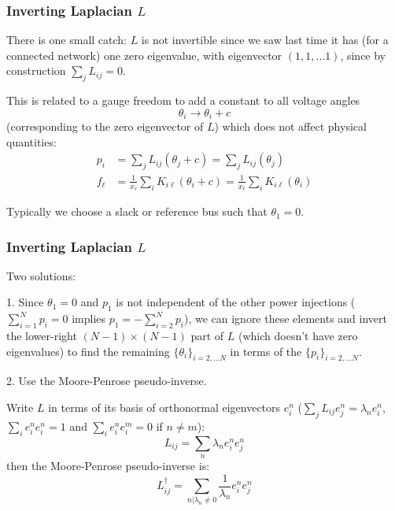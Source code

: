 \documentclass[10pt,dvipsnames]{beamer}
\def\l{\lambda}
\begin{document}
\begin{frame}
  \frametitle{Inverting Laplacian $L$}

  There is one small catch: $L$ is \alert{not invertible} since we saw last
  time it has (for a connected network) one zero eigenvalue, with
  eigenvector $(1,1, \dots 1)$, since by construction $\sum_j L_{ij} =
  0$.

  This is related to a gauge freedom to add a constant to all voltage angles
  \begin{equation*}
    \theta_i \to \theta_i + c
  \end{equation*}
  (corresponding to the zero eigenvector of $L$) which does not affect physical quantities:
    \begin{align*}
      p_i & = \sum_{j} L_{ij} (\theta_j+ c) = \sum_{j} L_{ij} (\theta_j)  \\
     f_\ell  & = \frac{1}{x_\ell}\sum_{i} K_{i\ell}( \theta_i  + c) = \frac{1}{x_\ell}\sum_{i} K_{i\ell}( \theta_i )
    \end{align*}

    Typically we choose a \alert{slack} or \alert{reference bus} such that  $\theta_1 = 0$.


\end{frame}

\begin{frame}
  \frametitle{Inverting Laplacian $L$}

  Two solutions:

  1. Since $\theta_1 = 0$ and $p_1$ is not independent of the other
  power injections ($\sum_{i=1}^N p_i = 0$ implies $p_1 = -
  \sum_{i=2}^N p_i$), we can ignore these elements and invert
  the lower-right $(N-1) \times (N-1)$ part of $L$ (which doesn't have zero eigenvalues) to find the
  remaining $\{\theta_i\}_{i=2,\dots N}$ in terms of the
  $\{p_i\}_{i=2,\dots N}$.

  2. Use the Moore-Penrose pseudo-inverse.

  Write $L$ in terms of its basis of orthonormal eigenvectors $e^n_i$ ($\sum_j L_{ij} e^n_j = \l_n e^n_i$, $\sum_i e^n_i e^n_i = 1$ and  $\sum_i e^n_i e^m_i = 0$ if $n \neq m$):
  \begin{equation*}
    L_{ij} = \sum_n \l_n e^n_i e^n_j
  \end{equation*}
  then the Moore-Penrose pseudo-inverse is:
  \begin{equation*}
    L^\dagger_{ij} = \sum_{n | \l_n \neq 0} \frac{1}{\l_n} e^n_i e^n_j
  \end{equation*}
\end{frame}
\end{document}
